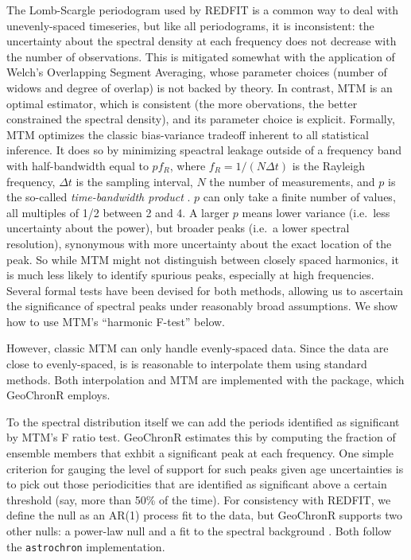 \documentclass[gchron, manuscript]{copernicus}
\begin{document}
The Lomb-Scargle periodogram used by REDFIT is a common way to deal with unevenly-spaced timeseries, but like all periodograms, it is inconsistent: the uncertainty about the spectral density at each frequency does not decrease with the number of observations. This is mitigated somewhat with the application of Welch's Overlapping Segment Averaging, whose parameter choices (number of widows and degree of overlap) is not backed by theory.
In contrast, MTM \citep{thomson82} is an optimal estimator, which is consistent (the more obervations, the better constrained the spectral density), and its parameter choice is explicit. Formally, MTM optimizes the classic bias-variance tradeoff inherent to all statistical inference.
It does so by minimizing speactral leakage outside of a frequency band with half-bandwidth equal to \(pf_R\), where \(f_R=1/(N \Delta t)\) is the Rayleigh frequency, \(\Delta t\) is the sampling interval, \(N\) the number of measurements, and \(p\) is the so-called \emph{time-bandwidth product} \citep{Ghil02}.
\(p\) can only take a finite number of values, all multiples of 1/2 between 2 and 4.
A larger \(p\) means lower variance (i.e.~less uncertainty about the power), but broader peaks (i.e.~a lower spectral resolution), synonymous with more uncertainty about the exact location of the peak.
So while MTM might not distinguish between closely spaced harmonics, it is much less likely to identify spurious peaks, especially at high frequencies.
Several formal tests have been devised for both methods, allowing us to ascertain the significance of spectral peaks under reasonably broad assumptions. We show how to use MTM's ``harmonic F-test'' below.

However, classic MTM can only handle evenly-spaced data. Since the data are close to evenly-spaced, is is reasonable to interpolate them using standard methods. Both interpolation and MTM are implemented with the \citep[astrochron][]{astrochron} package, which GeoChronR employs.

To the spectral distribution itself we can add the periods identified as significant by MTM's F ratio test. GeoChronR estimates this by computing the fraction of ensemble members that exhbit a significant peak at each frequency. One simple criterion for gauging the level of support for such peaks given age uncertainties is to pick out those periodicities that are identified as significant above a certain threshold (say, more than 50\% of the time). For consistency with REDFIT, we define the null as an AR(1) process fit to the data, but GeoChronR supports two other nulls: a power-law null and a fit to the spectral background \citep{MannLees96}.
Both follow the \texttt{astrochron} implementation.
\end{document}
